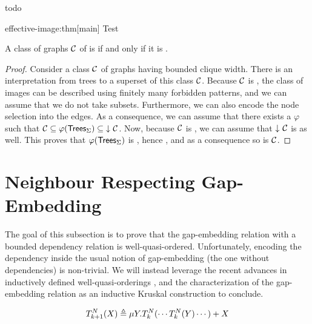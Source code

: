 \begin{example}
    \label{bad-generalized-gap:ex}
    todo
\end{example}


\begin{proofof}{effective-image:thm}[main]
    Test
\end{proofof}

\begin{corollary}
    \label{effective-image:cor}
    A class of graphs $\mathcal{C}$ of  
    is 
    if and only if it is .
\end{corollary}
\begin{proof}
    Consider a class $\mathcal{C}$ of graphs having bounded clique width.
    There is an interpretation from trees to a superset of this class $\mathcal{C}$.
    Because $\mathcal{C}$ is , the class of images
    can be described using finitely many forbidden patterns,
    and we can assume that we do not take subsets.
    Furthermore, we can also encode the node selection into the edges.
    As a consequence, we can assume that there exists a $\varphi$
    such that $\Cls \subseteq \varphi(\Trees{\Sigma}) \subseteq \dwset{\Cls}$.
    Now, because $\mathcal{C}$ is , we can assume that
    $\dwset{\Cls}$ is  as well.
    This proves that $\varphi(\mathsf{Trees}_{\Sigma})$ is ,
    hence ,
    and as a consequence so is $\mathcal{C}$.
\end{proof}

\section{Neighbour Respecting Gap-Embedding}
\label{sec:neighbour-respecting-gap-embedding}

The goal of this subsection is to prove that the gap-embedding relation with a
bounded dependency relation is well-quasi-ordered. Unfortunately, encoding the
dependency inside the usual notion of gap-embedding (the one without
dependencies) is non-trivial. We will instead leverage the recent advances in
inductively defined well-quasi-orderings \cite{FREU20,LOPEZ23}, and the
characterization of the gap-embedding relation as an inductive Kruskal
construction \cite{FREU20} to conclude.

\begin{equation*}
    T_{k+1}^N (X) \triangleq
    \mu Y. T_{k}^N( \cdots T_k^N(Y) \cdots ) + X
\end{equation*}

